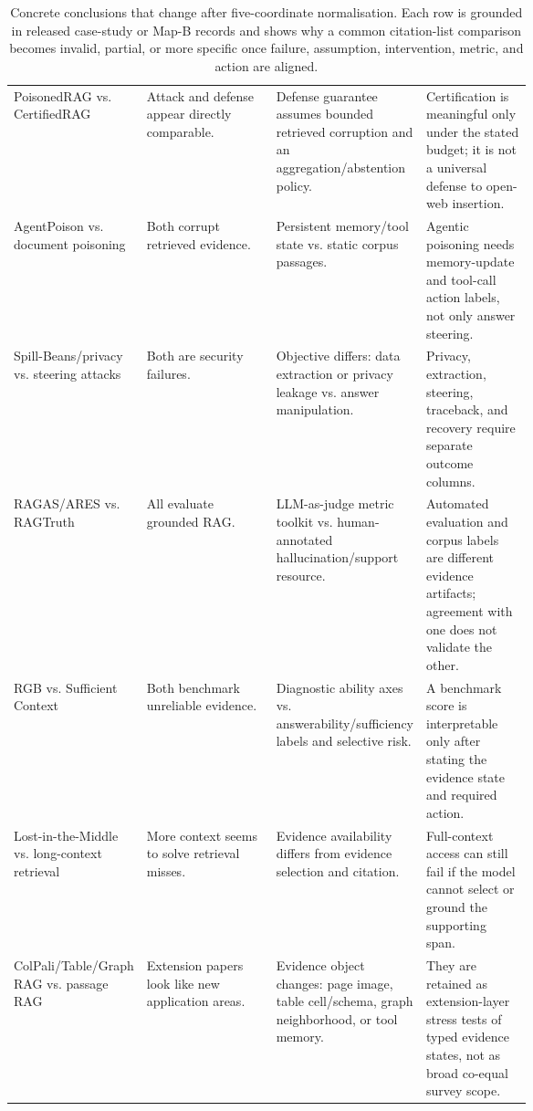 \begin{table}[t]
\begin{tabularx}{\linewidth}{>{\raggedright\arraybackslash}p{0.17\linewidth}>{\raggedright\arraybackslash}p{0.25\linewidth}>{\raggedright\arraybackslash}p{0.24\linewidth}X}
PoisonedRAG \citep{poisonedRAG2024} vs. CertifiedRAG \citep{certifiedRAG2024} & Attack and defense appear directly comparable. & Defense guarantee assumes bounded retrieved corruption and an aggregation/abstention policy. & Certification is meaningful only under the stated budget; it is not a universal defense to open-web insertion. \\
AgentPoison \citep{rrag053} vs. document poisoning \citep{poisonedRAG2024} & Both corrupt retrieved evidence. & Persistent memory/tool state vs. static corpus passages. & Agentic poisoning needs memory-update and tool-call action labels, not only answer steering. \\
Spill-Beans/privacy \citep{venue200SpillBeans} vs. steering attacks \citep{poisonedRAG2024} & Both are security failures. & Objective differs: data extraction or privacy leakage vs. answer manipulation. & Privacy, extraction, steering, traceback, and recovery require separate outcome columns. \\
RAGAS/ARES \citep{ragas2024,ares2024} vs. RAGTruth \citep{ragTruth2024} & All evaluate grounded RAG. & LLM-as-judge metric toolkit vs. human-annotated hallucination/support resource. & Automated evaluation and corpus labels are different evidence artifacts; agreement with one does not validate the other. \\
RGB \citep{rgb2023} vs. Sufficient Context \citep{sufficientContext2024} & Both benchmark unreliable evidence. & Diagnostic ability axes vs. answerability/sufficiency labels and selective risk. & A benchmark score is interpretable only after stating the evidence state and required action. \\
Lost-in-the-Middle \citep{liu2024lostmiddle} vs. long-context retrieval & More context seems to solve retrieval misses. & Evidence availability differs from evidence selection and citation. & Full-context access can still fail if the model cannot select or ground the supporting span. \\
ColPali/Table/Graph RAG \citep{colpali2025,tableRAG2024,venueAcc004} vs. passage RAG & Extension papers look like new application areas. & Evidence object changes: page image, table cell/schema, graph neighborhood, or tool memory. & They are retained as extension-layer stress tests of typed evidence states, not as broad co-equal survey scope. \\
\bottomrule
\end{tabularx}
\caption{Concrete conclusions that change after five-coordinate normalisation. Each row is grounded in released case-study or Map-B records and shows why a common citation-list comparison becomes invalid, partial, or more specific once failure, assumption, intervention, metric, and action are aligned.}
\label{tab:main-normalization-findings}
\end{table}
